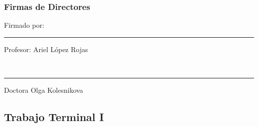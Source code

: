 \documentclass[12pt, a4paper, titlepage]{report}
\begin{document}
\newpage
\section*{Firmas de Directores}

\vfill  %
\noindent 
\parbox[b]{0.4\linewidth}{%
	\strut 
	Firmado por: \\[3cm]%
	\hrule
	Profesor: Ariel López Rojas} 
\hspace{1cm} %
\parbox[b]{0.4\linewidth}{%
	\strut 
	\\[3cm]%
	\hrule
	Doctora Olga Kolesnikova} 
\par\vspace{1cm} 
\newpage
\renewcommand\appendixpagename{Índice}
\renewcommand\appendixtocname{Índice}
\appendixpageoff
	\begin{appendices}
		\renewcommand*\contentsname{{\textcolor{azulescom}{Índice.}}}
		\tableofcontents
		\newpage
		\renewcommand*\listfigurename{{\textcolor{azulescom}{Índice de figuras.}}}
		\listoffigures
		\newpage
		\newpage
		\renewcommand*\listtablename{{\textcolor{azulescom}{Índice de cuadros.}}}
		\listoftables
	\end{appendices}
	
   \textcolor{guindapoli}{\part{Trabajo Terminal I}}
    
    \renewcommand\thechapter{\arabic{chapter}}
    \renewcommand{\appendixname}{Capítulo}
    \renewcommand{\lstlistingname}{C\'odigo}
    \renewcommand{\thepart}{}
    \renewcommand{\partname}{}
\end{document}
